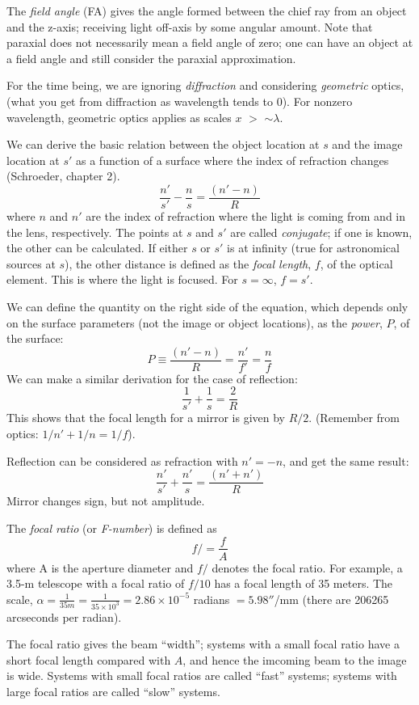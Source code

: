\documentclass[12pt]{article}
\begin{document}
The \emph{field angle} (FA) gives the angle formed between the chief ray from an
object and the z-axis; receiving light off-axis by some angular amount.
Note that paraxial does not necessarily mean a field angle of zero;
one can have an object at a field angle and still consider the paraxial approximation.

For the time being, we are ignoring \emph{diffraction}
and considering \emph{geometric} optics,
(what you get from diffraction as wavelength tends to 0).
For nonzero wavelength, geometric optics applies as scales
$x$ $>$ $\sim\lambda$.

We can derive the basic relation between the object location at $s$ and
the image location at $s'$ as a function of a surface where the index of
refraction changes (Schroeder, chapter 2).
$$  \frac{n'}{s'}-\frac{n}{s} = \frac{(n'-n)}{R}  $$
where $n$ and $n'$ are the index of refraction where the light is coming from
and in the lens, respectively.
The points at $s$ and $s'$ are called \emph{conjugate}; if one is known,
the other can be calculated. If either $s$
or $s'$ is at infinity (true for astronomical sources at $s$), the
other distance is defined as the \emph{focal length}, $f$, of the
optical element. This is where the light is focused. For $s=\infty$, $f=s'$.

We can define the quantity on the right side of the equation, which
depends only on the surface parameters (not the image or object
locations), as the \emph{power}, $P$, of the surface:
    $$ P \equiv \frac{(n'-n)}{R} = \frac{n'}{f'} = \frac{n}{f} $$
We can make a similar derivation for the case of reflection:
    $$ \frac{1}{s'} + \frac{1}{s} = \frac{2}{R}  $$
This shows that the focal length for a mirror is given by $R/2$.
(Remember from optics: $1/n' + 1/n = 1/f$).

Reflection can be considered as refraction with
$n' = -n$, and get the same result:
$$  \frac{n'}{s'}+\frac{n'}{s} = \frac{(n'+n')}{R}  $$
Mirror changes sign, but not amplitude.

The \emph{focal ratio} (or \emph{F-number}) is defined as
$$ f/ = \frac{f}{A}$$
where A is the aperture diameter and $f/$ denotes the focal ratio.
For example, a 3.5-m telescope with a focal ratio of $f /10$
has a focal length of 35 meters. The scale,
$\alpha = \frac{1}{35m} = \frac{1}{35\times10^3} = 2.86\times10^{-5}$
radians $ = 5.98''$/mm (there are 206265 arcseconds per radian).

The focal ratio gives the beam ``width''; systems with a small focal ratio
have a short focal length compared with $A$, and hence the imcoming
beam to the image is wide. Systems with small focal ratios are called
``fast'' systems; systems with large focal ratios are called ``slow'' systems.
\end{document}
